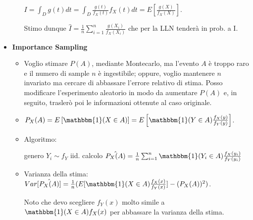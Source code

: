 \documentclass[8pt]{extarticle}
\begin{document}
\begin{multicols*}{3}
\begin{itemize}
\begin{itemize}
                  $I=\int_{D}g(t)dt=\int_{D}\frac{g(t)}{f_{X}(t)}f_{X}(t)dt=E[\frac{g(X)}{f_{X}(X)}]$.

                  Stimo dunque $\hat{I}=\frac{1}{n}\sum_{i=1}^{n}\frac{g(X_{i})}{f_{X}(X_{i})}$ che per la LLN tenderà in prob. a I.
              \end{itemize}
        \item \textbf{Importance Sampling}
              \begin{itemize}
                  \item Voglio stimare $P(A)$, mediante Montecarlo, ma l'evento $A$ è troppo raro e il numero di sample $n$ è ingestibile; oppure, voglio mantenere $n$ invariato ma cercare di abbassare l'errore relativo di stima. Posso modificare l'esperimento aleatorio in modo da aumentare $P(A)$ e, in seguito, traslerò poi le informazioni ottenute al caso originale.
                  \item $P_{X}(A)=E\left[\mathbbm{1}(X\in A)\right]=E\left[\mathbbm{1}(Y\in A)\frac{f_{X}(y)}{f_{Y}(y)}\right]$.
                  \item Algoritmo:
                  \begin{algorithmic}[1]
                            \State genero $Y_{i}\sim f_{Y}$ iid.
                            \State calcolo $\hat{P_{X}(A)}=\frac{1}{n}\sum_{i=1}^{n}\mathbbm{1}(Y_{i}\in A)\frac{f_{X}(y_{i})}{f_{Y}(y_{i})}$
                        \end{algorithmic}
                  \item Varianza della stima:
                  $\newline Var[\hat{P_{X}(A)}]=\frac{1}{n}(E[\mathbbm{1}(X\in A)\frac{f_{X}(x)}{f_{Y}(x)}]-(P_{X}(A))^{2})$.
                  
                  Noto che devo scegliere $f_{Y}(x)$ molto simile a $\mathbbm{1}(X\in A)f_{X}(x)$ per abbassare la varianza della stima.
              \end{itemize}
    \end{itemize}


\end{multicols*}
\end{document}
